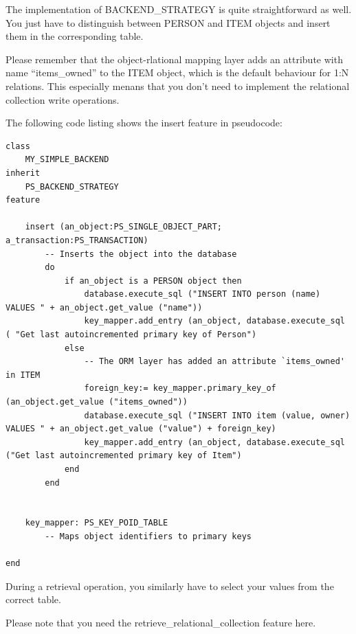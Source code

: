 The implementation of BACKEND\_STRATEGY is quite straightforward as well.
You just have to distinguish between PERSON and ITEM objects and insert them in the corresponding table.

Please remember that the object-rlational mapping layer adds an attribute with name ``items\_owned'' to the ITEM object, which is the default behaviour for 1:N relations.
This especially menans that you don't need to implement the relational collection write operations.

The following code listing shows the insert feature in pseudocode:

\begin{lstlisting}[language=OOSC2Eiffel, captionpos=b, caption={The collection handler for LINKED\_LIST}, label={lst:my_backend_adaption}]
class 
	MY_SIMPLE_BACKEND
inherit
	PS_BACKEND_STRATEGY
feature

	insert (an_object:PS_SINGLE_OBJECT_PART; a_transaction:PS_TRANSACTION)
		-- Inserts the object into the database
		do
			if an_object is a PERSON object then
				database.execute_sql ("INSERT INTO person (name) VALUES " + an_object.get_value ("name"))
				key_mapper.add_entry (an_object, database.execute_sql ( "Get last autoincremented primary key of Person")
			else
				-- The ORM layer has added an attribute `items_owned' in ITEM
				foreign_key:= key_mapper.primary_key_of (an_object.get_value ("items_owned"))
				database.execute_sql ("INSERT INTO item (value, owner) VALUES " + an_object.get_value ("value") + foreign_key)
				key_mapper.add_entry (an_object, database.execute_sql ("Get last autoincremented primary key of Item")
			end
		end


	key_mapper: PS_KEY_POID_TABLE
		-- Maps object identifiers to primary keys

end
\end{lstlisting}

During a retrieval operation, you similarly have to select your values from the correct table.

Please note that you need the retrieve\_relational\_collection feature here.






